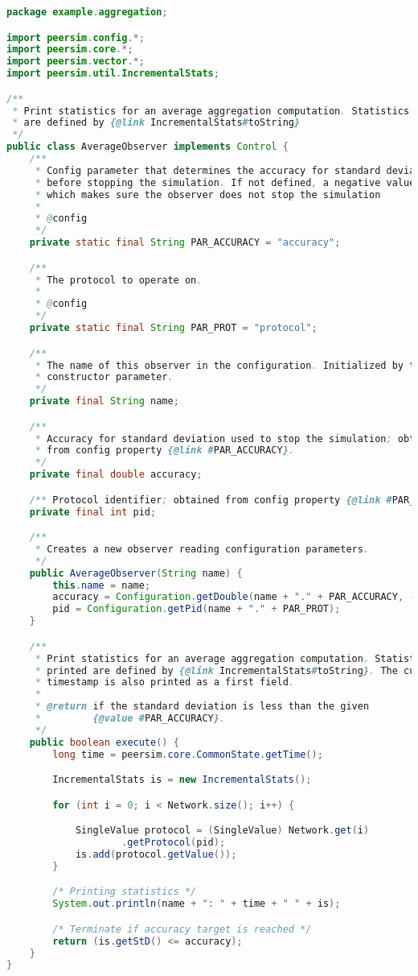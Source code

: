 \begin{lstlisting}[language=java, basicstyle=\footnotesize]
package example.aggregation;

import peersim.config.*;
import peersim.core.*;
import peersim.vector.*;
import peersim.util.IncrementalStats;

/**
 * Print statistics for an average aggregation computation. Statistics printed
 * are defined by {@link IncrementalStats#toString}
 */
public class AverageObserver implements Control {
    /**
     * Config parameter that determines the accuracy for standard deviation
     * before stopping the simulation. If not defined, a negative value is used
     * which makes sure the observer does not stop the simulation
     * 
     * @config
     */
    private static final String PAR_ACCURACY = "accuracy";

    /**
     * The protocol to operate on.
     * 
     * @config
     */
    private static final String PAR_PROT = "protocol";

    /**
     * The name of this observer in the configuration. Initialized by the
     * constructor parameter.
     */
    private final String name;

    /**
     * Accuracy for standard deviation used to stop the simulation; obtained
     * from config property {@link #PAR_ACCURACY}.
     */
    private final double accuracy;

    /** Protocol identifier; obtained from config property {@link #PAR_PROT}. */
    private final int pid;

    /**
     * Creates a new observer reading configuration parameters.
     */
    public AverageObserver(String name) {
        this.name = name;
        accuracy = Configuration.getDouble(name + "." + PAR_ACCURACY, -1);
        pid = Configuration.getPid(name + "." + PAR_PROT);
    }

    /**
     * Print statistics for an average aggregation computation. Statistics
     * printed are defined by {@link IncrementalStats#toString}. The current
     * timestamp is also printed as a first field.
     * 
     * @return if the standard deviation is less than the given
     *         {@value #PAR_ACCURACY}.
     */
    public boolean execute() {
        long time = peersim.core.CommonState.getTime();

        IncrementalStats is = new IncrementalStats();

        for (int i = 0; i < Network.size(); i++) {

            SingleValue protocol = (SingleValue) Network.get(i)
                    .getProtocol(pid);
            is.add(protocol.getValue());
        }

        /* Printing statistics */
        System.out.println(name + ": " + time + " " + is);

        /* Terminate if accuracy target is reached */
        return (is.getStD() <= accuracy);
    }
}
\end{lstlisting}
